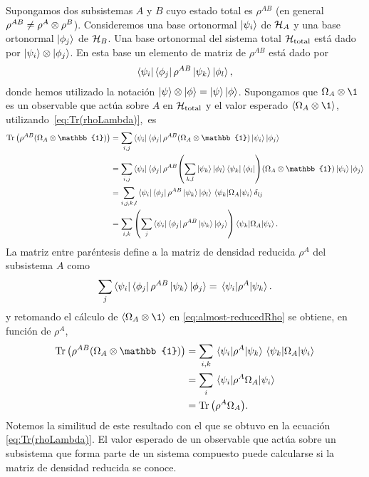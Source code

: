 Supongamos dos subsistemas $A$ y $B$ cuyo estado total es 
$\rho^{AB}$ (en general $\rho^{AB}\neq \rho^A\otimes \rho^B$). 
Consideremos una base ortonormal $\ket{\psi_i}$ de $\mathcal{H}_A$ y una 
base ortonormal $\ket{\phi_j}$ de $\mathcal{H}_B$. Una base ortonormal 
del sistema total $\mathcal{H}_{\text{total}}$ está dado 
por $\ket{\psi_i}\otimes \ket{\phi_j}$.
En esta base un elemento de matriz de $\rho^{AB}$ está dado por
\begin{align}
	\bra{\psi_i}\bra{\phi_j}\rho^{AB}\ket{\psi_k}\ket{\phi_l},
\end{align}
donde hemos utilizado la notación 
$\ket{\psi}\otimes\ket{\phi}=\ket{\psi}\ket{\phi}$.
Supongamos que $\Omega_A\ot \1$ es un observable que actúa sobre $A$
en $\mathcal{H}_{\text{total}}$ y el valor esperado 
$\expval{\Omega_A\ot \1}$, utilizando~\eqref{eq:Tr(rhoLambda)},~es
\begin{align}
	\Tr \qty(\rho^{AB}\qty(\Omega_A\ot \mathbb{1})) &= \sum _{i,j} 
	\bra{\psi_i}\bra{\phi_j}\rho^{AB}\qty(\Omega_A\ot \mathbb{1})
	\ket{\psi_i}\ket{\phi_j} 
	\nonumber\\
	&= \sum _{i,j} 
	\bra{\psi_i} \bra{\phi_j}\rho^{AB}
	\qty(\sum _{k,l} \ket{\psi_k} \ket{\phi_l} \bra{\psi_k}\bra{\phi_l} )
	\qty(\Omega_A\ot \mathbb{1})\ket{\psi_i} \ket{\phi_j}\nonumber\\
	&= \sum _{i,j,k,l} 
	\bra{\psi_i} \bra{\phi_j}\rho^{AB}\ket{\psi_k} \ket{\phi_l}
	\matrixel{\psi_k}{\Omega_A}{\psi_i}\delta _{lj}\nonumber\\
	&= \sum_{i,k}\qty(\sum _j 
	\bra{\psi_i} \bra{\phi_j}\rho^{AB}\ket{\psi_k} \ket{\phi_j})
	\matrixel{\psi_k}{\Omega_A}{\psi_i}.
	\label{eq:almost-reducedRho}
\end{align}
La matriz entre paréntesis define a la matriz de densidad
reducida $\rho^A$ del subsistema $A$ como~\cite{chandra2013quantum}
\begin{align}
	\sum _j \bra{\psi_i}\bra{\phi_j}\rho^{AB}\ket{\psi_k}\ket{\phi_j}
	= \matrixel{\psi_i}{\rho^A}{\psi_k}.
	\label{eq:reducedRho-def1}
\end{align}
y retomando el cálculo de $\expval{\Omega_A\ot \1}$
en \eqref{eq:almost-reducedRho} se obtiene, en función 
de $\rho^A$,
\begin{align}
	\Tr \qty(\rho^{AB}\qty(\Omega_A\ot \mathbb{1}))&= \sum _{i,k}\nonumber
	\matrixel{\psi_i}{\rho^A}{\psi_k} \matrixel{\psi_k}{\Omega_A}{\psi_i}
	\nonumber\\
	&= \sum_i \matrixel{\psi_i}{\rho^A\Omega_A}{\psi_i}\nonumber\\
	&= \Tr \qty(\rho^A\Omega_A). \label{eq:reduced-works}
\end{align}
Notemos la similitud de este resultado con el que se obtuvo en la ecuación
\eqref{eq:Tr(rhoLambda)}. El valor esperado de un observable que actúa 
sobre un subsistema que forma parte de un sistema compuesto puede 
calcularse si la matriz de densidad reducida se conoce.


